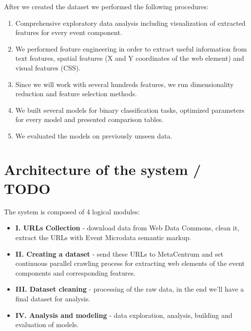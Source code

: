 After we created the dataset we performed the following procedures:
\begin{enumerate}
    \item Comprehensive exploratory data analysis including visualization of extracted features for every event component.
    \item We performed feature engineering in order to extract useful information from text features, spatial features (X and Y coordinates of the web element) and visual features (CSS). 
    \item Since we will work with several hundreds features, we run dimensionality reduction and feature selection methods. 
    \item We built several models for binary classification tasks, optimized parameters for every model and presented comparison tables.  
    \item We evaluated the models on previously unseen data.    
\end{enumerate}

\section{Architecture of the system / TODO}
\label{sec:arch}

The system is composed of 4 logical modules:

\begin{itemize}
    \item \textbf{I. URLs Collection} - download data from Web Data Commons, clean it, extract the URLs with Event Microdata semantic markup.
    \item \textbf{II. Creating a dataset} - send these URLs to MetaCentrum and set continuous parallel crawling process for extracting web elements of the event components and corresponding features.
    \item \textbf{III. Dataset cleaning} - processing of the raw data, in the end we'll have a final dataset for analysis.
    \item \textbf{IV. Analysis and modeling} - data exploration, analysis, building and evaluation of models.
\end{itemize}

